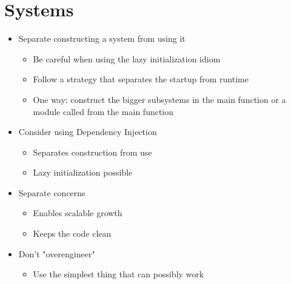 
\section{Systems}
\begin{itemize}
    \item Separate constructing a system from using it
    \begin{itemize}
        \item Be careful when using the lazy initialization idiom
        \item Follow a strategy that separates the startup from runtime
        \item One way: construct the bigger subsystems in the main function or a module called from the main function
    \end{itemize}
    \item Consider using Dependency Injection
    \begin{itemize}
        \item Separates construction from use
        \item Lazy initialization possible
    \end{itemize}
    \item Separate concerns
    \begin{itemize}
        \item Enables scalable growth
        \item Keeps the code clean
    \end{itemize}
    \item Don't "overengineer"
    \begin{itemize}
        \item Use the simplest thing that can possibly work
    \end{itemize}
\end{itemize}